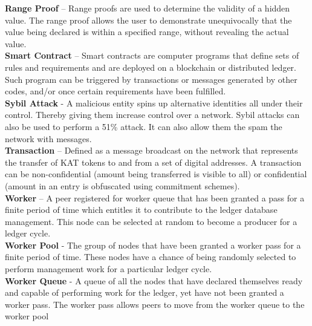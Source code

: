 \textbf{Range Proof} – Range proofs are used to determine the validity of a hidden value. The range proof allows the user to demonstrate unequivocally that the value being declared is within a specified range, without revealing the actual value. \\

\textbf{Smart Contract} – Smart contracts are computer programs that define sets of rules and requirements and are deployed on a blockchain or distributed ledger. Such program can be triggered by transactions or messages generated by other codes, and/or once certain requirements have been fulfilled. \\

\textbf{Sybil Attack} - A malicious entity spins up alternative identities all under their control. Thereby giving them increase control over a network. Sybil attacks can also be used to perform a 51\% attack. It can also allow them the spam the network with messages. \\

\textbf{Transaction} – Defined as a message broadcast on the network that represents the transfer of KAT tokens to and from a set of digital addresses. A transaction can be non-confidential (amount being transferred is visible to all) or confidential (amount in an entry is obfuscated using commitment schemes). \\

\textbf{Worker} – A peer registered for worker queue that has been granted a pass for a finite period of time which entitles it to contribute to the ledger database management. This node can be selected at random to become a producer for a ledger cycle. \\

\textbf{Worker Pool} - The group of nodes that have been granted a worker pass for a finite period of time. These nodes have a chance of being randomly selected to perform management work for a particular ledger cycle. \\

\textbf{Worker Queue} - A queue of all the nodes that have declared themselves ready and capable of performing work for the ledger, yet have not been granted a worker pass. The worker pass allows peers to move from the worker queue to the worker pool\\

